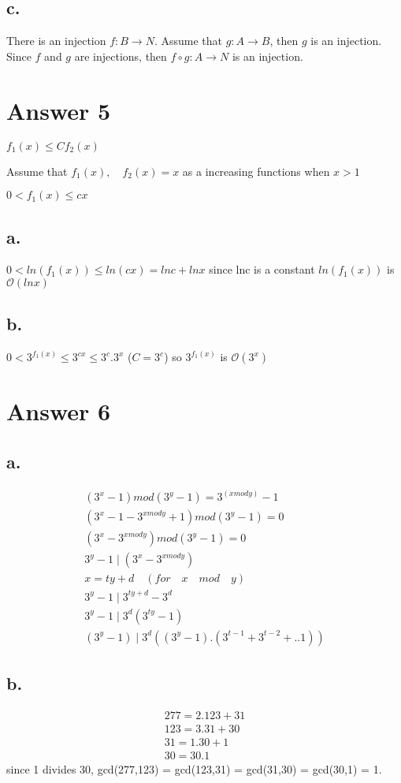 \documentclass[12pt]{article}
\begin{document}
\subsection*{c.}

\quad There is an injection $f : B \rightarrow N$. Assume that $g : A \rightarrow B$, then $g$ is an injection. Since $f$ and $g$ are injections, then $f \circ g : A \rightarrow N$ is an injection.

\section*{Answer 5}



$ f_1(x) \leq Cf_2(x)$

Assume that $f_1(x) ,\quad f_2(x) =x$ as a increasing functions when $x>1$



\quad \quad \quad $0<f_1(x) \leq cx$

\subsection*{a.}

\quad $0 < ln(f_1(x)) \leq ln(cx) = lnc + lnx$ since lnc is a constant $ln(f_1(x))$ is $ \mathcal{O} (lnx)$

\subsection*{b.}

\quad $0< 3^{f_1(x)} \leq 3^{cx} \leq 3^c.3^x$ ($C=3^c$) so $ 3^{f_1(x)}$ is $\mathcal{O} (3^x) $ 
\section*{Answer 6}

\subsection*{a.}
\begin{gather*}
(3^x - 1) mod (3^y-1) = 3^{(x  mod y)}-1\\
(3^x-1-3^{x mod y} +1) mod (3^y-1)= 0\\
(3^x-3^{x mod y}) mod (3^y-1) =0\\
3^y-1 \mid (3^x-3^{x mod y})\\
x=ty+d \quad (for \quad x \quad mod \quad y)\\
3^y-1 \mid 3^{ty+d}-3^d\\
3^y-1 \mid 3^d(3^{ty}-1)\\
(3^y-1) \mid 3^d((3^y-1).(3^{t-1}+3^{t-2}+..1))
\end{gather*}
 
\subsection*{b.}

\begin{gather*} 
277 = 2.123 + 31\\
123 = 3.31 + 30\\
31 = 1.30 + 1\\
30 = 30.1  
\end{gather*} since 1 divides 30, gcd(277,123) = gcd(123,31) = gcd(31,30) = gcd(30,1) = 1.
\end{document}
